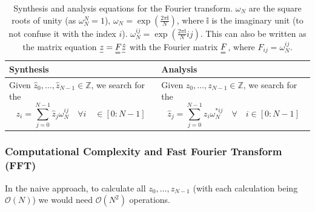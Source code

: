 \begin{table}
    \begin{tabular}{|p{}|p{}|}
        \hline
        \textbf{Synthesis} & \textbf{Analysis} \\
        \hline
        Given $\hat{z}_0, \dots, \hat{z}_{N-1} \in \mathbb{Z}$, we search for the
        \begin{equation}
            z_i=\sum_{j=0}^{N-1} \hat{z}_j \omega_N^{i j} \quad \forall i \quad \in[0: N-1]
        \end{equation} &
        Given $z_0, \dots, z_{N-1} \in \mathbb{Z}$, we search for the
        \begin{equation}
            \hat{z}_j=\sum_{j=0}^{N-1} z_i \omega_N^{* i j} \quad \forall \quad i \in[0: N-1]
        \end{equation} \\
        \hline
    \end{tabular}
    \caption{Synthesis and analysis equations for the Fourier transform. $\omega_N$ are the square roots of unity (as $\omega_N^N = 1$), $\omega_N = \exp{\left( \frac{2\pi \mathbb{i}}{N} \right)}$,
    where $\mathbb{i}$ is the imaginary unit (to not confuse it with the index $i$). $\omega_N^{i j} = \exp{\left( \frac{2\pi \mathbb{i}}{N} ij \right)}$. This can
    also be written as the matrix equation $\vec{z} = \mat{F} \vec{\hat{z}}$ with the Fourier matrix $\mat{F}$, where $F_{i j} = \omega_N^{i j}$.}
    \label{tab:fourier_synthesis_analysis}
\end{table}



\subsubsection{Computational Complexity and Fast Fourier Transform (FFT)}
In the naive approach, to calculate all $z_0, \dots, z_{N-1}$ (with each calculation being
$\mathcal{O}(N)$) we would need $\mathcal{O}(N^2)$ operations.


